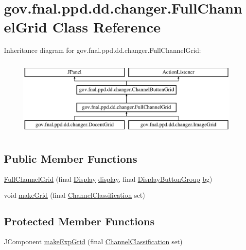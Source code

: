\hypertarget{classgov_1_1fnal_1_1ppd_1_1dd_1_1changer_1_1FullChannelGrid}{\section{gov.\-fnal.\-ppd.\-dd.\-changer.\-Full\-Channel\-Grid Class Reference}
\label{classgov_1_1fnal_1_1ppd_1_1dd_1_1changer_1_1FullChannelGrid}
}
Inheritance diagram for gov.\-fnal.\-ppd.\-dd.\-changer.\-Full\-Channel\-Grid\-:\begin{figure}[H]
\begin{center}
\leavevmode
\includegraphics[height=4.000000cm]{classgov_1_1fnal_1_1ppd_1_1dd_1_1changer_1_1FullChannelGrid}
\end{center}
\end{figure}
\subsection*{Public Member Functions}
\begin{DoxyCompactItemize}
\item 
\hyperlink{classgov_1_1fnal_1_1ppd_1_1dd_1_1changer_1_1FullChannelGrid_aa8e7f3ef1e60dd9311ab23cf4ed2a98d}{Full\-Channel\-Grid} (final \hyperlink{interfacegov_1_1fnal_1_1ppd_1_1dd_1_1signage_1_1Display}{Display} \hyperlink{classgov_1_1fnal_1_1ppd_1_1dd_1_1changer_1_1ChannelButtonGrid_a3c06b51489dcaacd16f6efcefe06bcaa}{display}, final \hyperlink{classgov_1_1fnal_1_1ppd_1_1dd_1_1util_1_1specific_1_1DisplayButtonGroup}{Display\-Button\-Group} \hyperlink{classgov_1_1fnal_1_1ppd_1_1dd_1_1changer_1_1ChannelButtonGrid_adf258a89161282e5215b4642ecbec812}{bg})
\item 
void \hyperlink{classgov_1_1fnal_1_1ppd_1_1dd_1_1changer_1_1FullChannelGrid_a5248322de4a979bfcd6c52c5850fb0ae}{make\-Grid} (final \hyperlink{classgov_1_1fnal_1_1ppd_1_1dd_1_1changer_1_1ChannelClassification}{Channel\-Classification} set)
\end{DoxyCompactItemize}
\subsection*{Protected Member Functions}
\begin{DoxyCompactItemize}
\item 
J\-Component \hyperlink{classgov_1_1fnal_1_1ppd_1_1dd_1_1changer_1_1FullChannelGrid_a16d82f1f6aa10b8f7ccb8d440c80857f}{make\-Exp\-Grid} (final \hyperlink{classgov_1_1fnal_1_1ppd_1_1dd_1_1changer_1_1ChannelClassification}{Channel\-Classification} set)
\end{DoxyCompactItemize}
